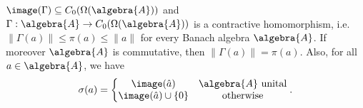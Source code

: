 \documentclass[a4paper]{article}
\begin{document}
\begin{theorem}
	$\image(\Gamma) \subseteq C_0(\Omega(\algebra{A}))$ and $\Gamma: \algebra{A} \to C_0(\Omega(\algebra{A}))$ is a contractive homomorphism, i.e. $\|\Gamma(a) \| \leq \pi(a) \leq \|a\|$ for every Banach algebra $\algebra{A}$.
	If moreover $\algebra{A}$ is commutative, then $\|\Gamma(a)\| = \pi(a)$.
	Also, for all $a \in \algebra{A}$, we have
	\begin{equation*}
		\sigma(a) = \left\{ \begin{matrix}
			\image(\hat a)            & \algebra{A} \text{ unital} \\
			\image(\hat a) \cup \{0\} & \text{otherwise}
		\end{matrix}  \right. \text{.}
	\end{equation*}
\end{theorem}
\end{document}
